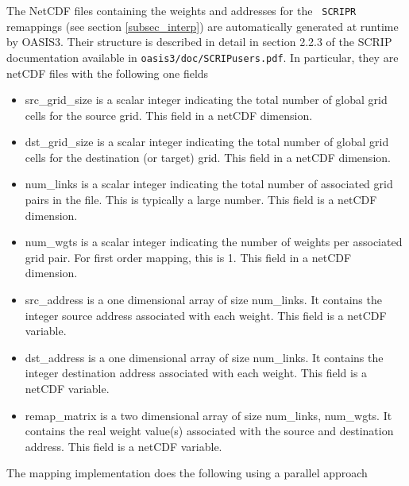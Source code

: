The NetCDF files containing the weights and addresses for the {\tt
  SCRIPR} remappings (see section \ref{subsec_interp})  are
  automatically generated at runtime by OASIS3. Their structure is
  described in detail in section 2.2.3 of the SCRIP documentation available
  in {\tt oasis3/doc/SCRIPusers.pdf}.  In particular, they are netCDF
  files with the following one fields
\begin{itemize}
\item src\_grid\_size is a scalar integer indicating the total number of
  global grid cells for the source grid.  This field
  in a netCDF dimension.
\item dst\_grid\_size is a scalar integer indicating the total number of
  global grid cells for the destination (or target) grid.  This field
  in a netCDF dimension.
\item num\_links is a scalar integer indicating the total number of associated
  grid pairs in the file.  This is typically a large number.  This field
  is a netCDF dimension.
\item num\_wgts is a scalar integer indicating the number of weights per
  associated grid pair.  For first order mapping, this is 1.  This field
  in a netCDF dimension.
\item src\_address is a one dimensional array of size num\_links.  It contains
  the integer source address associated with each weight.  This field is a
  netCDF variable.
\item dst\_address is a one dimensional array of size num\_links.  It contains
  the integer destination address associated with each weight.  This field is a
  netCDF variable.
\item remap\_matrix is a two dimensional array of size num\_links, num\_wgts.  It contains
  the real weight value(s) associated with the source and destination address. 
  This field is a netCDF variable.
\end{itemize}

The mapping implementation does the following using a parallel approach

